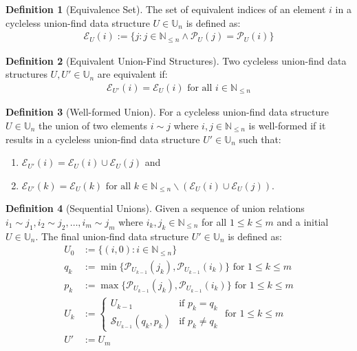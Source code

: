 \documentclass[a4paper,12pt]{article}
\theoremstyle{definition}
\newtheorem{definition}{Definition}[section]
\begin{document}
\begin{definition}[Equivalence Set]
    The set of equivalent indices of an element $i$ in a cycleless union-find
    data structure $U \in \mathbb{U}_n$ is defined as:
    \begin{align*}
        \mathcal{E}_U(i) := \{j : j \in \mathbb{N}_{\leq n} \land \mathcal{P}_U(j) = \mathcal{P}_U(i)\}
    \end{align*}
\end{definition}

\begin{definition}[Equivalent Union-Find Structures]
    Two cycleless union-find data structures $U, U' \in \mathbb{U}_n$ are
    equivalent if:
    \begin{align*}
        \mathcal{E}_{U'}(i) = \mathcal{E}_U(i) \text{ for all } i \in \mathbb{N}_{\leq n}
    \end{align*}
\end{definition}

\begin{definition}[Well-formed Union]
    For a cycleless union-find data structure $U \in \mathbb{U}_n$ the union of
    two elements $i \sim j$ where $i, j \in \mathbb{N}_{\leq n}$ is well-formed
    if it results in a cycleless union-find data structure $U' \in \mathbb{U}_n$
    such that:
    \begin{enumerate}
        \item $\mathcal{E}_{U'}(i) = \mathcal{E}_U(i) \cup \mathcal{E}_U(j)$ and
        \item $\mathcal{E}_{U'}(k) = \mathcal{E}_U(k) \text{ for all } k \in
        \mathbb{N}_{\leq n} \backslash (\mathcal{E}_U(i) \cup \mathcal{E}_U(j))$.
    \end{enumerate}
\end{definition}

\begin{definition}[Sequential Unions]\label{def:sequential-unions}
    Given a sequence of union relations $i_1 \sim j_1, i_2 \sim j_2, \ldots, i_m
    \sim j_m$ where $i_k, j_k \in \mathbb{N}_{\leq n}$ for all $1 \leq k \leq m$
    and a initial  $U \in \mathbb{U}_n$. The final union-find data structure $U'
    \in \mathbb{U}_n$ is
    defined as:
    \begin{align*}
        U_0 &:= \{(i, 0) : i \in \mathbb{N}_{\leq n}\} \\
        q_k &:= \min \{\mathcal{P}_{U_{k-1}}(j_k), \mathcal{P}_{U_{k-1}}(i_k)\} \text{ for } 1 \leq k \leq m \\
        p_k &:= \max \{\mathcal{P}_{U_{k-1}}(j_k), \mathcal{P}_{U_{k-1}}(i_k)\} \text{ for } 1 \leq k \leq m \\
        U_k &:= \begin{cases}
            U_{k-1} & \text{if } p_k = q_k \\
            \mathcal{S}_{U_{k-1}}(q_k, p_k) & \text{if } p_k \neq q_k
        \end{cases} \text{ for } 1 \leq k \leq m \\
        U' &:= U_m
    \end{align*}
\end{definition}
\end{document}
